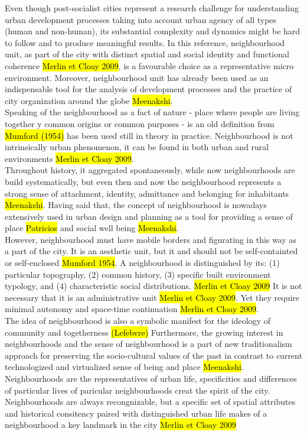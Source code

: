 \documentclass[11pt]{report}
\begin{document}
Even though post-socialist cities represent a research challenge for understanding urban development processes taking into account urban agency of all types (human and non-human), its substantial complexity and dynamics might be hard to follow and to produce meaningful results.
In this reference, neighbourhood unit, as part of the city with distinct spatial and social identity and functional coherence \hl{Merlin et Cloay 2009}, is a favourable choice as a representative micro environment.
Moreover, neighbourhood unit has already been used as an indispensable tool for the analysis of development processes and the practice of city organization around the globe \hl{Meenakshi}.
\\
Speaking of the neighbourhood as a fact of nature - place where people are living together y common origins or common purposes - is an old definition from \hl{Mumford (1954)} has been used still in theory in practice.
Neighbourhood is not intrinsically urban phenomenon, it can be found in both urban and rural environments
\hl{Merlin et Cloay 2009}.
\\
Throughout history, it aggregated spontaneously, while now neighbourhoods are build systematically, but even then and now the neighbourhood represents a strong sense of attachment, identity, admittance and belonging for inhabitants \hl{Meenakshi}.
Having said that, the concept of neighbourhood is nowadays extensively used in urban design and planning as a tool for providing a sense of place \hl{Patricios} and social well being \hl{Meenakshi}.
\\
However, neighbourhood must have mobile borders and figurating in this way as a part of the city. It is an aesthetic unit, but it and should not be self-containted or self-enclosed \hl{Mumford 1954}.
A neighbourhood is distinguished by its: (1) particular topography, (2) common history, (3) specific built environment typology, and (4) characteristic social distributions.
\hl{Merlin et Cloay 2009}
It is not necessary that it is an administrative unit \hl{Merlin et Cloay 2009}.
Yet they require minimal autonomy and space-time continuation \hl{Merlin et Cloay 2009}.
\\
The idea of neighbourhood is also a symbolic manifest for the ideology of community and togetherness \hl{(Lefebvre)}
Furthermore, the growing interest in neighbourhoods and the sense of neighbourhood is a part of new traditionalism approach for preserving the socio-cultural values of the past in contrast to current technologized and virtualized sense of being and place \hl{Meenakshi}.
Neighbourhoods are the representatives of urban life, specificities and differences of particular lives of paricular neighbourhoods creat the spirit of the city.
Neighbourhoods are always recongnizable, but a specific set of spatial attributes and historical consitency paired with distinguished urban life makes of a neighbourhood a key landmark in the city \hl{Merlin et Cloay 2009}
\end{document}
